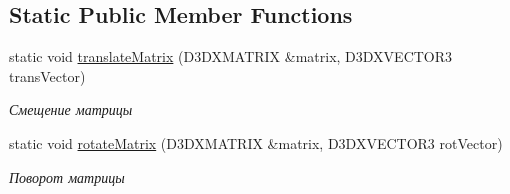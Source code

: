 \subsection*{Static Public Member Functions}
\begin{DoxyCompactItemize}
\item 
static void \hyperlink{class_mesh_class_a5f44b0d568183d300e2a08539c4232c1}{translate\+Matrix} (D3\+D\+X\+M\+A\+T\+R\+IX \&matrix, D3\+D\+X\+V\+E\+C\+T\+O\+R3 trans\+Vector)
\begin{DoxyCompactList}\small\item\em Смещение матрицы \end{DoxyCompactList}\item 
static void \hyperlink{class_mesh_class_a960255c0f0f255f6a4a97487eadbeae4}{rotate\+Matrix} (D3\+D\+X\+M\+A\+T\+R\+IX \&matrix, D3\+D\+X\+V\+E\+C\+T\+O\+R3 rot\+Vector)
\begin{DoxyCompactList}\small\item\em Поворот матрицы \end{DoxyCompactList}\end{DoxyCompactItemize}
